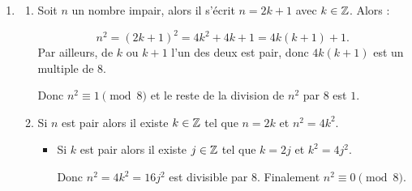 \begin{enumerate}[label=\thechapter.\arabic*, font=\bfseries, itemsep=7mm,labelsep*=3mm,left=0mm]
\begin{enumerate}[label=\alph*),itemsep=5mm,left=-1mm,labelsep*=2mm]
	\item \begin{itemize}\setlength{\itemsep}{2mm}
		\item $1532^{20}\equiv 2^{20} \equiv\left(2^4\right)^5 \equiv (-1)^5 \equiv -1 \equiv 16 \pmod{17}.$
		
		\smallskip
		Le reste de la division de $1532^{20}$ par 17 est 16.
		\item $346^{12}\equiv 6^{12} \equiv\left(6^2\right)^6 \equiv 2^6 \equiv 2^4\cdot 4 \equiv -4 \equiv 13 \pmod{17}.$
		
		\smallskip
		Le reste de la division de $346^{12}$ par 17 est 13.
	\end{itemize}
\end{enumerate}


%
%
%



\item
\begin{enumerate}[label=\alph*),itemsep=7mm,left=-1mm,labelsep*=2mm]
	\item\label{a} Soit $n$ un nombre impair, alors il s'écrit $n=2k+1$ avec $k\in \mathbb{Z}$. Alors :
	
	$$n^2 = (2k+1)^2 = 4k^2+4k+1 = 4k(k+1) + 1.$$ Par ailleurs, de $k$ ou $k+1$ l'un des deux est pair, donc $4k(k+1)$ est un multiple de 8.
	
	Donc $n^2 \equiv 1 \pmod{8}$ et le reste de la division de $n^2$ par $8$ est $1$.
	
	\item\label{b} Si $n$ est pair alors il existe $k\in \mathbb{Z}$ tel que $n=2k$ et $n^2 = 4k^2$.
	
	\begin{itemize}
		\item Si $k$ est pair alors il existe $j\in \mathbb{Z}$ tel que $k=2j$ et $k^2=4j^2$.
		
		Donc $n^2 = 4k^2 = 16j^2$ est divisible par $8$. Finalement $n^2 \equiv 0 \pmod{8}$.
		

\end{itemize}
\end{enumerate}
\end{enumerate}
